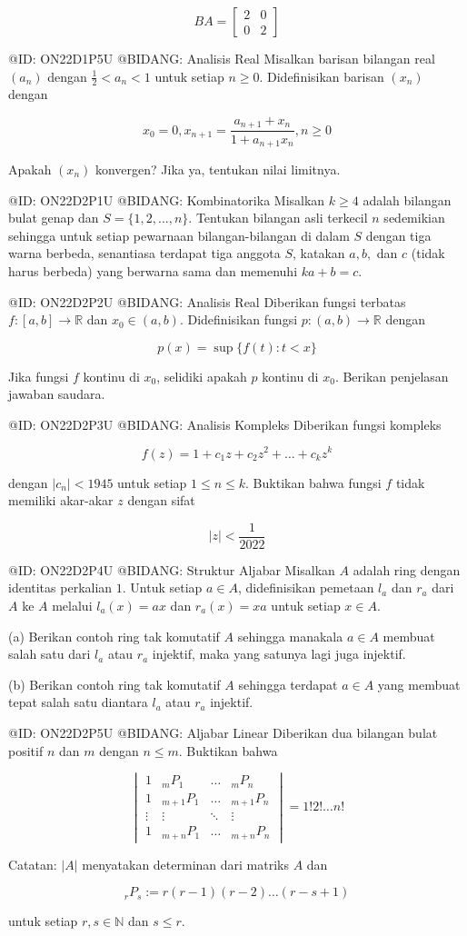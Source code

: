 $$
BA=\begin{bmatrix}2&0\\ 0&2\end{bmatrix}
$$

@ID: ON22D1P5U
@BIDANG: Analisis Real
Misalkan barisan bilangan real $(a_{n})$ dengan $\frac{1}{2}<a_{n}<1$ untuk setiap $n\ge0$. Didefinisikan barisan $(x_{n})$ dengan

$$
x_{0}=0, x_{n+1}=\frac{a_{n+1}+x_{n}}{1+a_{n+1}x_{n}}, n\ge0
$$

Apakah $(x_{n})$ konvergen? Jika ya, tentukan nilai limitnya.

@ID: ON22D2P1U
@BIDANG: Kombinatorika
Misalkan $k\ge4$ adalah bilangan bulat genap dan $S=\{1,2,...,n\}$. Tentukan bilangan asli terkecil $n$ sedemikian sehingga untuk setiap pewarnaan bilangan-bilangan di dalam $S$ dengan tiga warna berbeda, senantiasa terdapat tiga anggota $S$, katakan $a, b,$ dan $c$ (tidak harus berbeda) yang berwarna sama dan memenuhi $ka+b=c$.

@ID: ON22D2P2U
@BIDANG: Analisis Real
Diberikan fungsi terbatas $f:[a,b]\rightarrow\mathbb{R}$ dan $x_{0}\in(a,b)$. Didefinisikan fungsi $p:(a,b)\rightarrow\mathbb{R}$ dengan

$$
p(x)=\sup\{f(t):t<x\}
$$

Jika fungsi $f$ kontinu di $x_{0}$, selidiki apakah $p$ kontinu di $x_{0}$. Berikan penjelasan jawaban saudara.

@ID: ON22D2P3U
@BIDANG: Analisis Kompleks
Diberikan fungsi kompleks

$$
f(z)=1+c_{1}z+c_{2}z^{2}+\dots+c_{k}z^{k}
$$

dengan $|c_{n}|<1945$ untuk setiap $1\le n\le k$. Buktikan bahwa fungsi $f$ tidak memiliki akar-akar $z$ dengan sifat

$$
|z|<\frac{1}{2022}
$$

@ID: ON22D2P4U
@BIDANG: Struktur Aljabar
Misalkan $A$ adalah ring dengan identitas perkalian $1$. Untuk setiap $a\in A$, didefinisikan pemetaan $l_{a}$ dan $r_{a}$ dari $A$ ke $A$ melalui $l_{a}(x)=ax$ dan $r_{a}(x)=xa$ untuk setiap $x\in A$.

(a) Berikan contoh ring tak komutatif $A$ sehingga manakala $a\in A$ membuat salah satu dari $l_{a}$ atau $r_{a}$ injektif, maka yang satunya lagi juga injektif.

(b) Berikan contoh ring tak komutatif $A$ sehingga terdapat $a\in A$ yang membuat tepat salah satu diantara $l_{a}$ atau $r_{a}$ injektif.

@ID: ON22D2P5U
@BIDANG: Aljabar Linear
Diberikan dua bilangan bulat positif $n$ dan $m$ dengan $n\le m$. Buktikan bahwa

$$
\begin{vmatrix}1&_{m}P_{1}&\dots&_{m}P_{n}\\ 1&_{m+1}P_{1}&\dots&_{m+1}P_{n}\\ \vdots&\vdots&\ddots&\vdots\\ 1&_{m+n}P_{1}&\dots&_{m+n}P_{n}\end{vmatrix}=1!2!\dots n!
$$

Catatan: $|A|$ menyatakan determinan dari matriks $A$ dan

$$
_{r}P_{s}:=r(r-1)(r-2)\dots(r-s+1)
$$

untuk setiap $r, s\in\mathbb{N}$ dan $s\le r$.